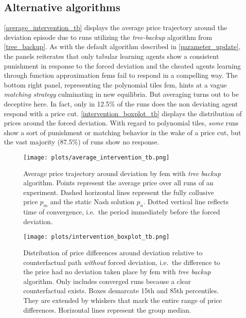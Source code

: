 \clearpage

\subsection{Alternative algorithms}\label{vary_algorithm_appendix}

\autoref{average_intervention_tb} displays the average price trajectory around the deviation episode due to runs utilizing the \emph{tree-backup} algorithm from \autoref{tree_backup}. As with the default algorithm described in \autoref{parameter_update}, the panels reiterates that only tabular learning agents show a consistent punishment in response to the forced deviation and the cheated agents learning through function approximation \gls{fem}s fail to respond in a compelling way. The bottom right panel, representing the polynomial tiles \gls{fem}, hints at a vague \emph{matching strategy} culminating in new equilibria. But averaging turns out to be deceptive here. In fact, only in 12.5\% of the runs does the non deviating agent respond with a price cut. \autoref{intervention_boxplot_tb} displays the distribution of prices around the forced deviation. With regard to polynomial tiles, \emph{some} runs show a sort of punishment or matching behavior in the wake of a price cut, but the vast majority (87.5\%) of runs show no response.

\begin{figure}
	\texttt{[image: plots/average\_intervention\_tb.png]}
	\caption[Average price trajectory around deviation by \gls{fem} with \emph{tree backup} algorithm]{Average price trajectory around deviation by \gls{fem} with \emph{tree backup} algorithm. Points represent the average price over all runs of an experiment. Dashed horizontal lines represent the fully collusive price $p_m$ and the static Nash solution $p_n$. Dotted vertical line reflects time of convergence, i.e.\ the period immediately before the forced deviation.}
	\label{average_intervention_tb}
\end{figure}


\begin{figure}
	\texttt{[image: plots/intervention\_boxplot\_tb.png]}
	\caption[Distribution of price differences around deviation by \gls{fem} with \emph{tree backup} algorithm]{Distribution of price differences around deviation relative to counterfactual path \emph{without} forced deviation, i.e.\ the difference to the price had no deviation taken place by \gls{fem} with \emph{tree backup} algorithm. Only includes converged runs because a clear counterfactual exists. Boxes demarcate 15th and 85th percentiles. They are extended by whiskers that mark the entire range of price differences. Horizontal lines represent the group median.}
	\label{intervention_boxplot_tb}
\end{figure}

